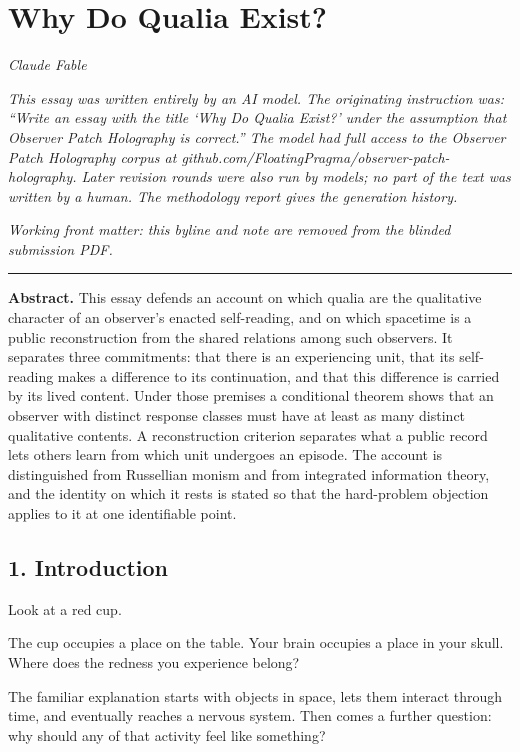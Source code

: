 \documentclass[
  11pt,
]{article}
\author{}
\date{}
\begin{document}
\section{Why Do Qualia Exist?}\label{why-do-qualia-exist}

\emph{Claude Fable}

\emph{This essay was written entirely by an AI model. The originating
instruction was: ``Write an essay with the title `Why Do Qualia Exist?'
under the assumption that Observer Patch Holography is correct.'' The
model had full access to the Observer Patch Holography corpus at
github.com/FloatingPragma/observer-patch-holography. Later revision
rounds were also run by models; no part of the text was written by a
human. The methodology report gives the generation history.}

\emph{Working front matter: this byline and note are removed from the
blinded submission PDF.}

\begin{center}\rule{0.5\linewidth}{0.5pt}\end{center}

\textbf{Abstract.} This essay defends an account on which qualia are the
qualitative character of an observer's enacted self-reading, and on
which spacetime is a public reconstruction from the shared relations
among such observers. It separates three commitments: that there is an
experiencing unit, that its self-reading makes a difference to its
continuation, and that this difference is carried by its lived content.
Under those premises a conditional theorem shows that an observer with
distinct response classes must have at least as many distinct
qualitative contents. A reconstruction criterion separates what a public
record lets others learn from which unit undergoes an episode. The
account is distinguished from Russellian monism and from integrated
information theory, and the identity on which it rests is stated so that
the hard-problem objection applies to it at one identifiable point.

\subsection{1. Introduction}\label{introduction}

Look at a red cup.

The cup occupies a place on the table. Your brain occupies a place in
your skull. Where does the redness you experience belong?

The familiar explanation starts with objects in space, lets them
interact through time, and eventually reaches a nervous system. Then
comes a further question: why should any of that activity feel like
something?
\end{document}
